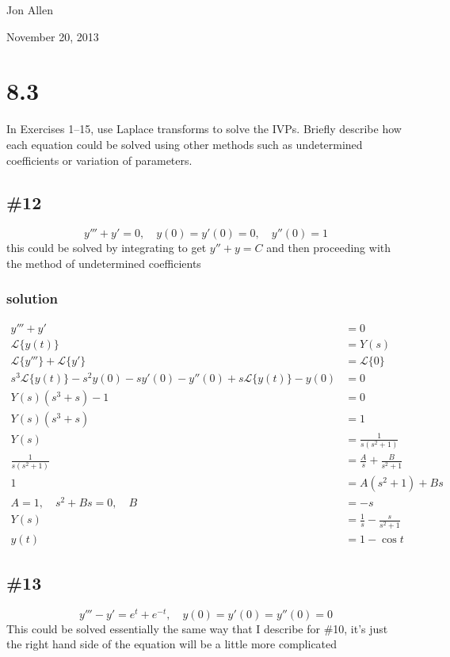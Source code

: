 \documentclass{article}
\begin{document}
Jon Allen

November 20, 2013

\section*{8.3}
In Exercises 1–15, use Laplace transforms to solve the IVPs. Briefly describe how each
equation could be solved using other methods such as undetermined coefficients or variation
of parameters.
\subsection*{\#12}
\[y'''+y'=0,\quad y(0)=y'(0)=0,\quad y''(0)=1\]
this could be solved by integrating to get $y''+y=C$ and then proceeding with the method of undetermined coefficients
\subsubsection*{solution}
\begin{align*}
	y'''+y'&=0\\
	\mathcal{L}\{y(t)\}&=Y(s)\\
	\mathcal{L}\{y'''\}+\mathcal{L}\{y'\}&=\mathcal{L}\{0\}\\
	s^3\mathcal{L}\{y(t)\}-s^2y(0)-sy'(0)-y''(0)+s\mathcal{L}\{y(t)\}-y(0)&=0\\
	Y(s)\left(s^3+s\right)-1&=0\\
	Y(s)\left(s^3+s\right)&=1\\
	Y(s)&=\frac{1}{s(s^2+1)}\\
	\frac{1}{s(s^2+1)}&=\frac{A}{s}+\frac{B}{s^2+1}\\
	1&=A(s^2+1)+Bs\\
	A=1, \quad s^2+Bs=0,\quad B&=-s\\
	Y(s)&=\frac{1}{s}-\frac{s}{s^2+1}\\
	y(t)&=1-\cos t
\end{align*}
\subsection*{\#13}
\[y'''-y'=e^t+e^{-t},\quad y(0)=y'(0)=y''(0)=0\]
This could be solved essentially the same way that I describe for \#10, it's just the right hand side of the equation will be a little more complicated
\end{document}
